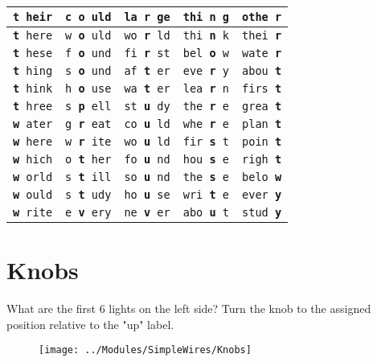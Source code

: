\documentclass[]{article}
\begin{document}
\begin{tabular}{|l|l|l|l|l|}
\hline \rule[-1ex]{0pt}{3.5ex} \texttt{\textbf{t} heir} & \texttt{c \textbf{o} uld} & \texttt{la \textbf{r} ge} & \texttt{thi \textbf{n} g} & \texttt{othe \textbf{r}} \\
\hline \rule[-1ex]{0pt}{3.5ex} \texttt{\textbf{t} here} & \texttt{w \textbf{o} uld} & \texttt{wo \textbf{r} ld} & \texttt{thi \textbf{n} k} & \texttt{thei \textbf{r}} \\
\hline \rule[-1ex]{0pt}{3.5ex} \texttt{\textbf{t} hese} & \texttt{f \textbf{o} und} & \texttt{fi \textbf{r} st} & \texttt{bel \textbf{o} w} & \texttt{wate \textbf{r}} \\
\hline \rule[-1ex]{0pt}{3.5ex} \texttt{\textbf{t} hing} & \texttt{s \textbf{o} und} & \texttt{af \textbf{t} er} & \texttt{eve \textbf{r} y} & \texttt{abou \textbf{t}} \\
\hline \rule[-1ex]{0pt}{3.5ex} \texttt{\textbf{t} hink} & \texttt{h \textbf{o} use} & \texttt{wa \textbf{t} er} & \texttt{lea \textbf{r} n} & \texttt{firs \textbf{t}} \\
\hline \rule[-1ex]{0pt}{3.5ex} \texttt{\textbf{t} hree} & \texttt{s \textbf{p} ell} & \texttt{st \textbf{u} dy} & \texttt{the \textbf{r} e} & \texttt{grea \textbf{t}} \\
\hline \rule[-1ex]{0pt}{3.5ex} \texttt{\textbf{w} ater} & \texttt{g \textbf{r} eat} & \texttt{co \textbf{u} ld} & \texttt{whe \textbf{r} e} & \texttt{plan \textbf{t}} \\
\hline \rule[-1ex]{0pt}{3.5ex} \texttt{\textbf{w} here} & \texttt{w \textbf{r} ite} & \texttt{wo \textbf{u} ld} & \texttt{fir \textbf{s} t} & \texttt{poin \textbf{t}} \\
\hline \rule[-1ex]{0pt}{3.5ex} \texttt{\textbf{w} hich} & \texttt{o \textbf{t} her} & \texttt{fo \textbf{u} nd} & \texttt{hou \textbf{s} e} & \texttt{righ \textbf{t}} \\
\hline \rule[-1ex]{0pt}{3.5ex} \texttt{\textbf{w} orld} & \texttt{s \textbf{t} ill} & \texttt{so \textbf{u} nd} & \texttt{the \textbf{s} e} & \texttt{belo \textbf{w}} \\
\hline \rule[-1ex]{0pt}{3.5ex} \texttt{\textbf{w} ould} & \texttt{s \textbf{t} udy} & \texttt{ho \textbf{u} se} & \texttt{wri \textbf{t} e} & \texttt{ever \textbf{y}} \\
\hline \rule[-1ex]{0pt}{3.5ex} \texttt{\textbf{w} rite} & \texttt{e \textbf{v} ery} & \texttt{ne \textbf{v} er} & \texttt{abo \textbf{u} t} & \texttt{stud \textbf{y}} \\
\hline
\end{tabular}

\newpage
\section{Knobs}
What are the first 6 lights on the left side?
Turn the knob to the assigned position relative to the "up" label.

\begin{figure}[h!]
\texttt{[image: ../Modules/SimpleWires/Knobs]}
\end{figure}
\end{document}
